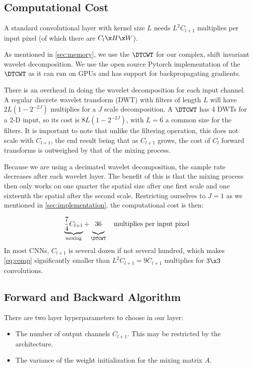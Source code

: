 \subsection{Computational Cost}\label{sec:computation}
A standard convolutional layer with kernel size $L$ needs $L^2C_{l+1}$
multiplies per input pixel (of which there are $C_{l}\x H\x W$).

As mentioned in \autoref{sec:memory}, we use the $\DTCWT$ for our complex, shift
invariant wavelet decomposition. We use the open source Pytorch implementation
of the $\DTCWT$ \cite{cotter_pytorch_2018} as it can run on GPUs and
has support for backpropagating gradients.

There is an overhead in doing the wavelet decomposition for each input channel. A
regular discrete wavelet transform (DWT) with filters of length $L$ will have
$2L\left(1-2^{-2J}\right)$ multiplies for a $J$ scale decomposition. A $\DTCWT$
has 4 DWTs for a 2-D input, so its cost is $8L\left(1-2^{-2J}\right)$, with
$L=6$ a common size for the filters. It is important to note that unlike the
filtering operation, this does not scale with $C_{l+1}$, the end result being that as
$C_{l+1}$ grows, the cost of $C_l$ forward transforms is outweighed by that of the mixing
process.

Because we are using a decimated wavelet decomposition, the sample rate decreases after each
wavelet layer. The benefit of this is that the mixing process then only works on
one quarter the spatial size after one first scale and one sixteenth the spatial
after the second scale. Restricting ourselves to $J=1$ as we mentioned in
\autoref{sec:implementation}, the computational cost is then:

\begin{equation}
  \underbrace{ \frac{7}{4}C_{l+1} }_{\textrm{mixing}} +
  \underbrace{\vphantom{\frac{7}{4}} 36}_{\DTCWT} \quad
  \textrm{multiplies per input pixel}\label{eq:comp}
\end{equation}
In most CNNs, $C_{l+1}$ is several dozen if not several
hundred, which makes \autoref{eq:comp} significantly smaller than
$L^2C_{l+1}=9C_{l+1}$ multiplies for $3\x 3$ convolutions.

\subsection{Forward and Backward Algorithm}
There are two layer hyperparameters to choose in our layer:
\begin{itemize}
  \item The number of output channels $C_{l+1}$. This may be restricted by the
    architecture.
  \item The variance of the weight initialization for the mixing matrix $A$.
\end{itemize}

